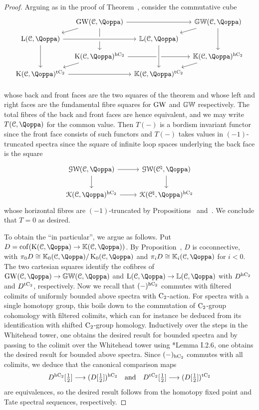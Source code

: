 \begin{proof}
Arguing as in the proof of Theorem~, consider the commutative cube
\[
\begin{tikzcd}
[column sep=0.5em, row sep=0.7em]
  & \GW(\C,\QF)\ar[rr]\ar[dd] \ar[ld]&& \KGW(\C,\QF)\ar[dd]\ar[ld]\\
\L(\C,\QF)\ar[rr, crossing over]\ar[dd] && \KL(\C,\QF)\\
  & \K(\C,\QF)^\hC\ar[rr]\ar[ld] && \KK(\C,\QF)^\hC\ar[ld]\\
\K(\C,\QF)^\tC\ar[rr] && \KK(\C,\QF)^\tC\ar[uu,<-, crossing over]\\
\end{tikzcd}
\]
whose back and front faces are the two squares of the theorem and whose left and right faces are the fundamental fibre squares for $\operatorname{GW}$ and $\mathbb{GW}$ respectively. %
The total fibres of the back and front faces are hence equivalent, and we may write $T(\C,\QF)$ for the common value. Then $T(-)$ is a bordism invariant functor since the front face consists of such functors and $T(-)$ takes values in $(-1)$-truncated spectra since the square of infinite loop spaces underlying the back face is the square
\[
\begin{tikzcd}
\GWspace(\C,\QF)\ar[r]\ar[d] & \GWspace(\C^{\natural},\QF)\ar[d]  \\
\Kspace(\C,\QF)^\hC\ar[r] & \Kspace(\C^{\natural},\QF)^\hC
\end{tikzcd}
\]
whose horizontal fibres are $(-1)$-truncated by Propositions~ and~. We conclude that $T=0$ as desired.

To obtain the ``in particular'', we argue as follows. Put $D=\cof(\K(\C,\QF)\to\KK(\C,\QF))$.
By Proposition~,
$D$ is coconnective, with
$\pi_0 D\cong\KK_0(\C,\QF)/\K_0(\C,\QF)$ and
$\pi_i D\cong\KK_i(\C,\QF)$ for $i<0$.
The two cartesian squares identify the cofibres of
$\GW(\C,\QF)\to\KGW(\C,\QF)$ and
$\L(\C,\QF)\to\KL(\C,\QF)$ with
$D^{{\mathrm{h}\mathrm{C_2}}}$ and $D^{{\mathrm{t}\mathrm{C_2}}}$, respectively.
Now we recall that $(-)^{{\mathrm{h}\mathrm{C_2}}}$ commutes with filtered colimits of uniformly bounded above spectra with $\mathrm{C_2}$-action. For spectra with a single homotopy group, this boils down to the commutation of $\mathrm{C_2}$-group cohomology with filtered colimits, which can for instance be deduced from its identification with shifted $\mathrm{C_2}$-group homology. Inductively over the steps in the Whitehead tower, one obtains the desired result for bounded spectra and by passing to the colimit over the Whitehead tower using \cite{NS}*{Lemma I.2.6}, one obtains the desired result for bounded above spectra.
Since $(-)_{{\mathrm{h}\mathrm{C_2}}}$ commutes with all colimits, we deduce that the canonical comparison maps 
\[
D^{{\mathrm{h}\mathrm{C_2}}}[\tfrac{1}{2}]
\longrightarrow (D[\tfrac{1}{2}])^{{\mathrm{h}\mathrm{C_2}}}
\quad\text{and}\quad
D^{{\mathrm{t}\mathrm{C_2}}}[\tfrac{1}{2}]
\longrightarrow (D[\tfrac{1}{2}])^{{\mathrm{t}\mathrm{C_2}}}
\]
are equivalences, so the desired result follows from the homotopy fixed point and Tate spectral sequences, respectively.
\end{proof}




